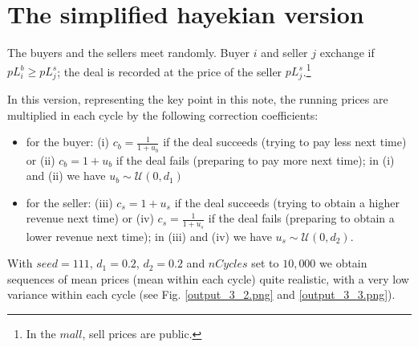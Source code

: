 \documentclass[10pt]{report}
\begin{document}
\section{The simplified hayekian version}\label{The hayekian version}
 
The buyers and the sellers meet randomly. Buyer $i$ and seller $j$ exchange if  $pL^b_i \geq pL^s_j$; the deal is recorded at the price of the seller $pL^s_j$.\footnote{In the $mall$, sell prices are public.}

In this version, representing the key point in this note, the running prices are multiplied in each cycle by the following  correction coefficients:

\begin{itemize}
\item for the buyer: (i) $c_b=\frac{1} {1 + u_b}$ if the deal succeeds (trying to pay less next time) or (ii) $c_b=1 + u_b$ if the deal fails (preparing to pay more next time); in (i) and (ii) we have $u_b\sim\mathcal{U}(0,d_1)$

\item for the seller: (iii) $c_s=1 + u_s$ if the deal succeeds (trying to obtain a higher revenue next time) or (iv) $c_s=\frac{1} {1 + u_s}$  if the deal fails (preparing to obtain a lower revenue next time); in (iii) and (iv) we have $u_s\sim\mathcal{U}(0,d_2)$.
\end{itemize}

With $seed=111$, $d_1=0.2$, $d_2=0.2$ and $nCycles$ set to $10,000$ we obtain sequences of mean prices (mean within each cycle) quite realistic, with a very low variance within each cycle (see Fig. \ref{output_3_2.png} and \ref{output_3_3.png}).
\end{document}
